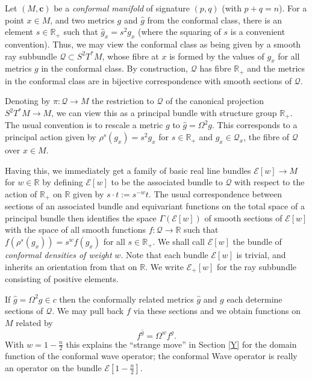 \documentclass[a4paper,12pt]{amsart}
\def\Cal{\mathcal}
\newcommand{\cc}{\boldsymbol{c}}
\newcommand{\ce}{{\Cal E}}
\theoremstyle{remark}
\begin{document}
\newcommand{\cq}{{\Cal Q}} 
\newcommand{\vol}{\operatorname{vol}}
\newcommand{\Ga}{\Gamma}


Let $(M,\cc)$ be a  {\em conformal
manifold\/} of signature $(p,q)$ (with $p+q=n$).
For a point $x\in M$, and two metrics $g$ and $\hat g$ from the
conformal class, there is an element $s\in\mathbb{R}_+$ such that $\hat
g_x=s^2g_x$ (where the squaring of $s$ is a convenient convention). Thus, we may view the conformal class as being
given by a smooth ray subbundle $\cq\subset S^2T^*M$, whose fibre at $x$ is
formed by the values of $g_x$ for all metrics $g$ in the conformal
class. By construction, $\cq$ has fibre $\mathbb{R}_+$ and the metrics in
the conformal class are in bijective correspondence with smooth
sections of $\cq$.

Denoting by $\pi:\cq\to M$ the restriction to $\cq$ of the canonical
projection $S^2T^*M\to M$, we can view this as a principal bundle with
structure group $\mathbb{R}_+$. The usual convention is to rescale a metric $ g$ to $\hat g=\Omega^2g$. This corresponds to a principal action given by $\rho^s(g_x)=s^2g_x$ for $s\in\mathbb{R}_+$ and $g_x\in \cq_x$, the fibre of $\cq$ over $x\in M$.

Having this, we immediately get a family of basic real line bundles
$\ce[w]\to M$ for $w\in\mathbb{R}$ by defining $\ce[w]$ to be the
associated bundle to $\cq$ with respect to the action of $\mathbb{R}_+$ on
$\mathbb{R}$ given by $s\cdot t:=s^{-w}t$. The usual correspondence
between sections of an associated bundle and equivariant functions on
the total space of a principal bundle then identifies the space
$\Ga(\ce[w])$ of smooth sections of $\ce[w]$ with the space of all
smooth functions $f:\cq\to\mathbb{R}$ such that $f(\rho^s(g_x))=s^w
f(g_x)$ for all $s\in\mathbb{R}_+$. We shall call $\ce[w]$ the bundle of
{\em conformal densities of weight} $w$. Note that each bundle
$\ce[w]$ is trivial, and inherits an orientation from that on
$\mathbb{R}$. We write $\ce_+[w]$ for the ray subbundle consisting of
positive elements. 

If $\widehat{g}=\Omega^2 g\in c$ then the conformally related metrics
$\widehat{g}$ and $g$ each determine sections of $\cq$. We may pull
back $f$ via these sections and we obtain functions on $M$ related by
$$
f^{\widehat{g}}= \Omega^w f^g.
$$ With $w=1-\frac{n}{2}$ this explains the ``strange move'' in Section
\ref{Y} for the domain function of the conformal wave operator; the conformal Wave operator is really an operator on the bundle $\ce[1-\frac{n}{2}]$.
\end{document}
